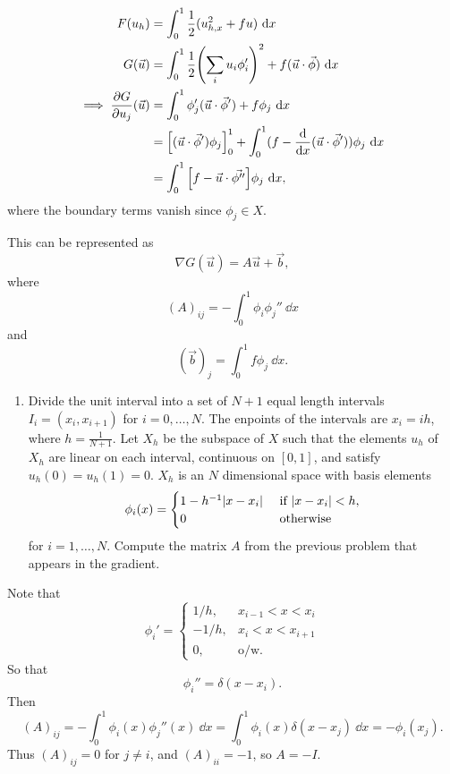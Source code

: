 \documentclass[12pt]{article}
\begin{document}
\begin{align*}
F(u_h) &= \int_0^1 \dfrac{1}{2}(u_{h,x}^2 + fu) \ \dd x \\
G(\vec{u}) &= \int_0^1 \dfrac{1}{2} \qty(\sum_i u_i \phi_i')^2 + f(\vec{u}\cdot\vec{\phi}) \ \dd x \\
\implies \dfrac{\partial G}{\partial u_j}(\vec{u}) &= \int_0^1 \phi_j'(\vec{u}\cdot\vec{\phi}') + f \phi_j  \ \dd x \\
&= \qty[(\vec{u}\cdot\vec{\phi}')\phi_j]_0^1 + \int_0^1 (f- \dfrac{\dd }{\dd x}(\vec{u}\cdot\vec{\phi}'))\phi_j \ \dd x\\
&= \int_0^1 \qty[f- \vec{u}\cdot\vec{\phi''} ]\phi_j \ \dd x,
\end{align*}
where the boundary terms vanish since $\phi_j \in X$.

This can be represented as
$$\nabla G (\vec{u}) = A\vec{u} + \vec{b},$$
where $$(A)_{ij} = - \int_0^1 \phi_i \phi_j'' \ \dd x$$
and $$(\vec{b})_j = \int_0^1 f \phi_j \ \dd x.$$
\begin{enumerate}[ \ \ (d)]
\item    Divide the unit interval into a set of $N+1$ equal length intervals $I_i = (x_i,x_{i+1})$ for $i = 0, \dots, N$.  The enpoints of the intervals are $x_i = ih$, where $h = \frac{1}{N+1}$.  Let $X_h$ be the subspace of $X$ such that the elements $u_h$ of $X_h$ are linear on each interval, continuous on $[0,1]$, and satisfy $u_h(0) = u_h(1) = 0$.  $X_h$ is an $N$ dimensional space with basis elements
    \begin{align}
        \phi_i(x) = \begin{cases}
            1 - h^{-1}\abs{x - x_i} & \text{ if } \abs{x - x_i} < h,\\
            0 & \text{ otherwise}
        \end{cases}
    \end{align}
    for $i = 1, \dots, N$.  Compute the matrix $A$ from the previous problem that appears in the gradient.
\end{enumerate}

Note that $$\phi_i ' = \begin{cases}
  1/h, & x_{i-1} < x < x_i \\ -1/h, & x_i < x < x_{i+1} \\ 0, & \text{o/w}. \end{cases}$$
So that $$\phi_i'' = \delta(x-x_i).$$
Then $$(A)_{ij} = - \int_0^1 \phi_i(x)\phi_j''(x) \ \dd x = \int_0^1 \phi_i(x) \delta(x-x_j) \ \dd x= -\phi_i(x_j).$$
Thus $(A)_{ij} = 0$ for $j\neq i$, and $(A)_{ii} = -1$, so $A = -I$. 
\end{document}
